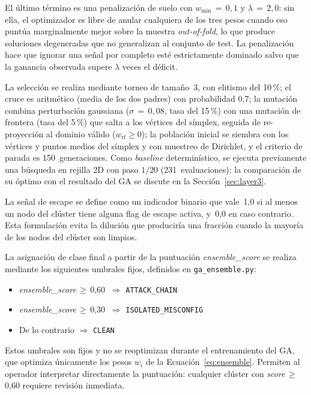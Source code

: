 El último término es una penalización de suelo con \(w_{\min}\,=\,0{,}1\) y
\(\lambda\,=\,2{,}0\): sin ella, el optimizador es libre de anular cualquiera de
los tres pesos cuando eso puntúa marginalmente mejor sobre la muestra
\textit{out-of-fold}, lo que produce soluciones degeneradas que no generalizan al
conjunto de test. La penalización hace que ignorar una señal por completo esté
estrictamente dominado salvo que la ganancia observada supere \(\lambda\) veces el
déficit.

La selección se realiza mediante torneo de tamaño~3, con elitismo del 10\,\%; el cruce
es aritmético (media de los dos padres) con probabilidad 0,7; la mutación combina
perturbación gaussiana (\(\sigma\,=\,0{,}08\), tasa del 15\,\%) con una mutación de
frontera (tasa del 5\,\%) que salta a los vértices del símplex, seguida de
re-proyección al dominio válido (\(w_{\text{rf}} \geq 0\)); la población inicial se
siembra con los vértices y puntos medios del símplex y con muestreo de Dirichlet, y el
criterio de parada es 150~generaciones.
Como \textit{baseline} determinístico, se ejecuta previamente una búsqueda en rejilla
2D con paso \(1/20\) (231~evaluaciones); la comparación de su óptimo con el resultado
del \ac{GA} se discute en la Sección~\ref{sec:layer3}.

La señal de escape se define como un indicador binario que vale~1,0 si al menos un
nodo del clúster tiene alguna flag de escape activa, y~0,0 en caso contrario. Esta
formulación evita la dilución que produciría una fracción cuando la mayoría de los
nodos del clúster son limpios.

La asignación de clase final a partir de la puntuación \textit{ensemble\_score}
se realiza mediante los siguientes umbrales fijos, definidos en
\texttt{ga\_ensemble.py}:
\begin{itemize}
  \item \textit{ensemble\_score}\,\(\geq\)\,0,60 \(\ \Rightarrow\) \texttt{ATTACK\_CHAIN}
  \item \textit{ensemble\_score}\,\(\geq\)\,0,30 \(\ \Rightarrow\) \texttt{ISOLATED\_MISCONFIG}
  \item De lo contrario \(\Rightarrow\) \texttt{CLEAN}
\end{itemize}
Estos umbrales son fijos y no se reoptimizan durante el entrenamiento del \ac{GA},
que optimiza únicamente los pesos \(w_i\) de la Ecuación~\ref{eq:ensemble}.
Permiten al operador interpretar directamente la puntuación: cualquier clúster con
\textit{score}\,\(\geq\)\,0,60 requiere revisión inmediata.

